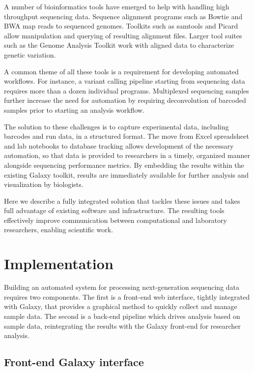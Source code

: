 \documentclass[10pt]{bmc_article}
\newenvironment{bmcformat}{\begin{raggedright}\baselineskip20pt\sloppy\setboolean{publ}{false}}{\end{raggedright}\baselineskip20pt\sloppy}
\begin{document}
\begin{bmcformat}
A number of bioinformatics tools have emerged to help with handling
high throughput sequencing data. Sequence alignment programs such as
Bowtie \cite{langmead_ultrafast_2009} and BWA \cite{li_fast_2009}
map reads to sequenced genomes. Toolkits such
as samtools \cite{li_sequence_2009} and Picard \cite{_picard_????}
allow manipulation and querying of resulting alignment files. Larger
tool suites such as the Genome Analysis Toolkit
\cite{mckenna_genome_2010} work with aligned data to characterize
genetic variation.

A common theme of all these tools is a requirement for developing
automated workflows. For instance, a variant calling pipeline starting
from sequencing data requires more than a dozen individual
programs. Multiplexed sequencing samples further increase the need for
automation by requiring deconvolution of barcoded samples prior to
starting an analysis workflow.

The solution to these challenges is to capture experimental data,
including barcodes and run data, in a structured format. The move from
Excel spreadsheet and lab notebooks to database tracking allows development of the
necessary automation, so that data is provided to researchers in a
timely, organized manner alongside sequencing performance metrics.
By embedding the results within the existing Galaxy toolkit, results
are immediately available for further analysis and visualization by
biologists.

Here we describe a fully integrated solution that tackles these
issues and takes full advantage of existing software and
infrastructure. The resulting tools effectively improve communication
between computational and laboratory researchers, enabling scientific work.

\section*{Implementation}

Building an automated system for processing next-generation sequencing
data requires two components. The first is a front-end web interface,
tightly integrated with Galaxy, that provides a graphical method to
quickly collect and manage sample data. The second is a back-end
pipeline which drives analysis based on sample data, reintegrating
the results with the Galaxy front-end for researcher analysis.

\subsection*{Front-end Galaxy interface}


\end{bmcformat}
\end{document}
